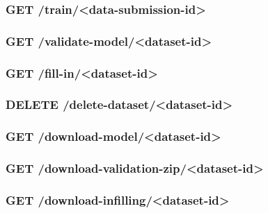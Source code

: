 \subsubsection*{GET /train/<data-submission-id>}

\subsubsection*{GET /validate-model/<dataset-id>}

\subsubsection*{GET /fill-in/<dataset-id>}

\subsubsection*{DELETE /delete-dataset/<dataset-id>}

\subsubsection*{GET /download-model/<dataset-id>}

\subsubsection*{GET /download-validation-zip/<dataset-id>}

\subsubsection*{GET /download-infilling/<dataset-id>}
